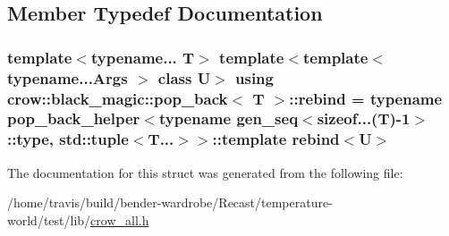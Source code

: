 \subsection{Member Typedef Documentation}
\hypertarget{structcrow_1_1black__magic_1_1pop__back_a4c6a6f10af4f26498a17007b211cdaef}{
\subsubsection[{rebind}]{\setlength{\rightskip}{0pt plus 5cm}template$<$typename... T$>$ template$<$template$<$ typename...\-Args $>$ class U$>$ using {\bf crow\-::black\-\_\-magic\-::pop\-\_\-back}$<$ T $>$\-::{\bf rebind} =  typename {\bf pop\-\_\-back\-\_\-helper}$<$typename {\bf gen\-\_\-seq}$<$sizeof...(T)-\/1$>$\-::type, std\-::tuple$<$T...$>$$>$\-::template {\bf rebind}$<$U$>$}}\label{structcrow_1_1black__magic_1_1pop__back_a4c6a6f10af4f26498a17007b211cdaef}


The documentation for this struct was generated from the following file\-:\begin{DoxyCompactItemize}
\item 
/home/travis/build/bender-\/wardrobe/\-Recast/temperature-\/world/test/lib/\hyperlink{crow__all_8h}{crow\-\_\-all.\-h}\end{DoxyCompactItemize}
